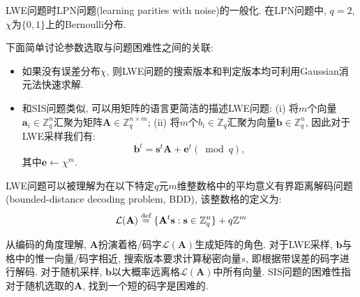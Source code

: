 \begin{remark}
LWE问题时LPN问题(learning parities with noise)的一般化. 在LPN问题中, $q=2$, $\chi$为$\{0,1\}$上的Bernoulli分布. 
\end{remark}

下面简单讨论参数选取与问题困难性之间的关联: 
\begin{itemize}
\item 如果没有误差分布$\chi$, 则LWE问题的搜索版本和判定版本均可利用Gaussian消元法快速求解. 

\item 和SIS问题类似, 可以用矩阵的语言更简洁的描述LWE问题: 
	(i) 将$m$个向量$\mathbf{a}_i \in \mathbb{Z}_q^n$汇聚为矩阵$\mathbf{A} \in \mathbb{Z}_q^{n \times m}$; 
	(ii) 将$m$个$b_i \in \mathbb{Z}_q$汇聚为向量$\mathbf{b} \in \mathbb{Z}_q^n$, 因此对于LWE采样我们有: 
	\begin{equation*}
		\mathbf{b}^t = \mathbf{s}^t \mathbf{A} + \mathbf{e}^t (\bmod q),
	\end{equation*}
	其中$\mathbf{e} \leftarrow \chi^m$. 
\end{itemize}

LWE问题可以被理解为在以下特定$q$元$m$维整数格中的平均意义有界距离解码问题(bounded-distance decoding problem, BDD), 该整数格的定义为: 
\begin{equation*}
\mathcal{L}(\mathbf{A}) \stackrel{\textup{def}}{=} \{\mathbf{A}^t \mathbf{s}: \mathbf{s} \in \mathbb{Z}_q^n\}+q \mathbb{Z}^m 
\end{equation*}

从编码的角度理解, $\mathbf{A}$扮演着格/码字$\mathcal{L}(\mathbf{A})$生成矩阵的角色. 
对于LWE采样, $\mathbf{b}$与格中的惟一向量/码字相近, 搜索版本要求计算秘密向量$s$, 即根据带误差的码字进行解码. 
对于随机采样, $\mathbf{b}$以大概率远离格$\mathcal{L}(\mathbf{A})$中所有向量.   
SIS问题的困难性指对于随机选取的$\mathbf{A}$, 找到一个短的码字是困难的. 